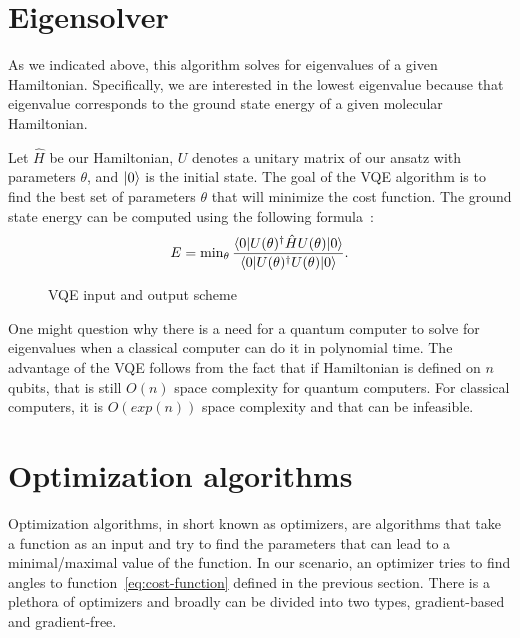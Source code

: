 \section{Eigensolver}
As we indicated above, this algorithm solves for eigenvalues of a given Hamiltonian. Specifically, we are interested in the lowest eigenvalue because that eigenvalue corresponds to the ground state energy of a given molecular Hamiltonian. 

Let $\hat{H}$ be our Hamiltonian, $U$ denotes a unitary matrix of our ansatz with parameters $\theta$, and $\lvert0\rangle$ is the initial state. The goal of the VQE algorithm is to find the best set of parameters $\theta$ that will minimize the cost function. The ground state energy can be computed using the following formula~\cite{vqe_method}:
\begin{equation}\label{eq:cost-function}
E = \min\nolimits_{\theta} \frac{\langle0\rvert U(\theta)^\dag \hat{H} U(\theta) \lvert0\rangle}{\langle0\rvert U(\theta)^\dag U(\theta) \lvert0\rangle} \text{.}
\end{equation}

\begin{figure}[H] 
    \caption{VQE input and output scheme}
\end{figure}

One might question why there is a need for a quantum computer to solve for eigenvalues when a classical computer can do it in polynomial time. The advantage of the VQE follows from the fact that if Hamiltonian is defined on $n$ qubits, that is still $O(n)$ space complexity for quantum computers. For classical computers, it is $O(exp(n))$ space complexity and that can be infeasible.

\section{Optimization algorithms}
Optimization algorithms, in short known as optimizers, are algorithms that take a function as an input and try to find the parameters that can lead to a minimal/maximal value of the function. In our scenario, an optimizer tries to find angles to function~\ref{eq:cost-function} defined in the previous section. There is a plethora of optimizers and broadly can be divided into two types, gradient-based and gradient-free.

